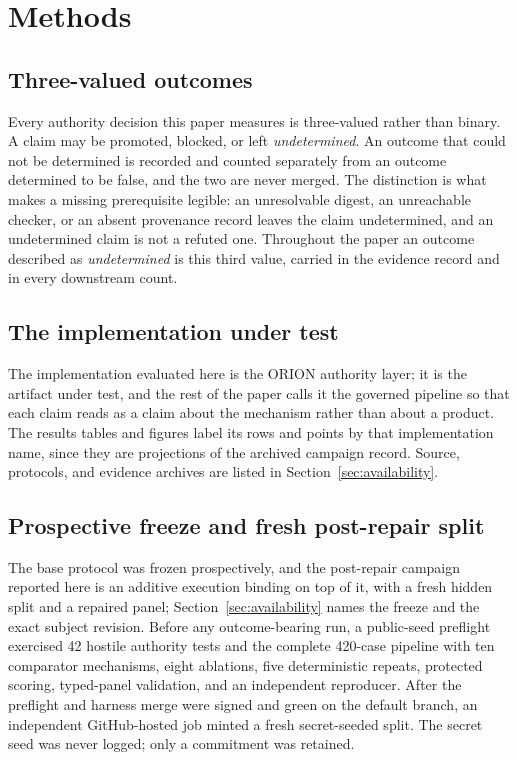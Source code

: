 \section{Methods}
\label{sec:methods}

\subsection{Three-valued outcomes}
Every authority decision this paper measures is three-valued rather than binary. A claim may be promoted, blocked, or left \emph{undetermined}. An outcome that could not be determined is recorded and counted separately from an outcome determined to be false, and the two are never merged. The distinction is what makes a missing prerequisite legible: an unresolvable digest, an unreachable checker, or an absent provenance record leaves the claim undetermined, and an undetermined claim is not a refuted one. Throughout the paper an outcome described as \emph{undetermined} is this third value, carried in the evidence record and in every downstream count.

\subsection{The implementation under test}
The implementation evaluated here is the ORION authority layer; it is the artifact under test, and the rest of the paper calls it the governed pipeline so that each claim reads as a claim about the mechanism rather than about a product. The results tables and figures label its rows and points by that implementation name, since they are projections of the archived campaign record. Source, protocols, and evidence archives are listed in Section~\ref{sec:availability}.

\subsection{Prospective freeze and fresh post-repair split}
The base protocol was frozen prospectively, and the post-repair campaign reported here is an additive execution binding on top of it, with a fresh hidden split and a repaired panel; Section~\ref{sec:availability} names the freeze and the exact subject revision. Before any outcome-bearing run, a public-seed preflight exercised 42 hostile authority tests and the complete 420-case pipeline with ten comparator mechanisms, eight ablations, five deterministic repeats, protected scoring, typed-panel validation, and an independent reproducer. After the preflight and harness merge were signed and green on the default branch, an independent GitHub-hosted job minted a fresh secret-seeded split. The secret seed was never logged; only a commitment was retained.

